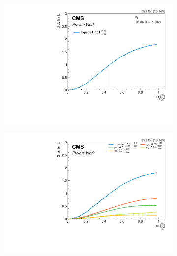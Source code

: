 \begin{figure}[h!]
    \centering
    \begin{subfigure}{.49\textwidth}
        \centering
        \includegraphics[width=\textwidth]{Figures/statana/Scan_JEC_mela3D/alpha.pdf}
    \end{subfigure}
    \begin{subfigure}{.49\textwidth}
        \centering
        \includegraphics[width=\textwidth]{Figures/statana/Scan_JEC_mela3D/alpha_channel.pdf}

\end{subfigure}
\end{figure}
